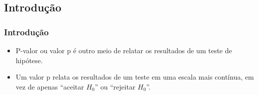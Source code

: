 \graphicspath{{images/}} %




















\begin{frame}[c]
\section{Introdução}
\frametitle{Introdução} 
\begin{itemize}
    \justifying
    \item P-valor ou valor p é outro meio de relatar os resultados de um teste de hipótese.
    \item Um valor p relata os resultados de um teste em uma escala mais contínua, em vez de apenas ``aceitar $H_0$'' ou ``rejeitar $H_0$''.
\end{itemize}
\end{frame}

